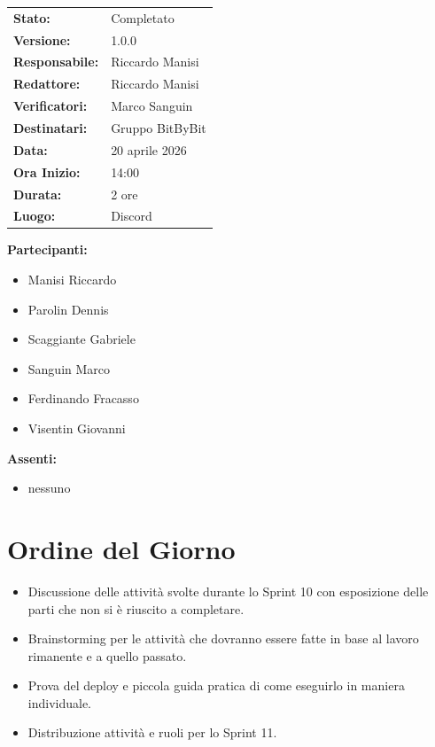 \documentclass[a4paper,12pt]{article}
\begin{document}
\begin{tcolorbox}
\begin{tabularx}{\textwidth}{@{}l X@{}}
\textbf{Stato:} & Completato\\
\textbf{Versione:} & 1.0.0\\
\textbf{Responsabile:} & Riccardo Manisi\\
\textbf{Redattore:} & Riccardo Manisi \\
\textbf{Verificatori:} & Marco Sanguin\\
\textbf{Destinatari:} & Gruppo BitByBit\\
\textbf{Data:} & 20 aprile 2026 \\
\textbf{Ora Inizio:} & 14:00 \\
\textbf{Durata:} & 2 ore \\
\textbf{Luogo:} & Discord \\
\end{tabularx}
\end{tcolorbox}

\vspace{0.4cm}
\textbf{Partecipanti:}
\begin{itemize}
    \item Manisi Riccardo
    \item Parolin Dennis
    \item Scaggiante Gabriele
    \item Sanguin Marco
    \item Ferdinando Fracasso
    \item Visentin Giovanni
\end{itemize}

\textbf{Assenti:}
\begin{itemize}
    \item nessuno
\end{itemize}

\clearpage

\vspace{0.5cm}

\vspace{0.8cm}

\clearpage
\tableofcontents
\thispagestyle{empty} %
\clearpage


\section{Ordine del Giorno}
\begin{itemize}
    \item Discussione delle attività svolte durante lo Sprint 10 con esposizione delle parti che non si è riuscito a completare.
    \item Brainstorming per le attività che dovranno essere fatte in base al lavoro rimanente e a quello passato.
    \item Prova del deploy e piccola guida pratica di come eseguirlo in maniera individuale.
    \item Distribuzione attività e ruoli per lo Sprint 11.
\end{itemize}
\end{document}
